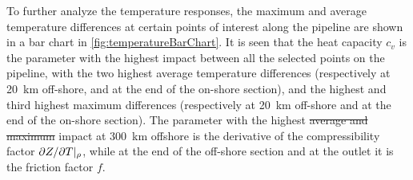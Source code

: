 

To further analyze the temperature responses, the maximum and average temperature differences at certain points of interest along the pipeline are shown in a bar chart in \cref{fig:temperatureBarChart}. %
It is seen that the heat capacity $c_v$ is the parameter with the highest impact between all the selected points on the pipeline, with the two highest average temperature differences (respectively at \SI{20}{\kilo\meter} off-shore, and at the end of the on-shore section), and the highest and third highest maximum differences (respectively at \SI{20}{\kilo\meter} off-shore and at the end of the on-shore section). The parameter with the highest \st{average and maximum} impact at \SI{300}{\kilo\meter} offshore is the derivative of the compressibility factor $\partial Z/\partial T\/|_\rho$, while at the end of the off-shore section and at the outlet it is the friction factor $f$.


